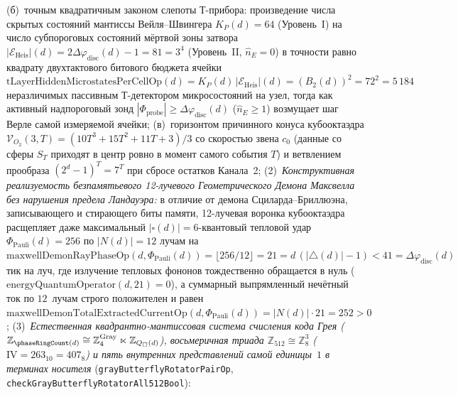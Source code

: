 \begin{theorem}
\begin{enumerate}[label=\textbf{(\roman*)},leftmargin=*]
\begin{itemize}[noitemsep,leftmargin=*]
\begin{enumerate}[label=(\alph*),noitemsep]
      (б)~точным квадратичным законом слепоты Т-прибора: произведение числа скрытых состояний мантиссы Вейля--Швингера $K_P(d)=64$ (Уровень~I) на число субпороговых состояний мёртвой зоны затвора $|\mathcal{E}_{\mathrm{Heis}}|(d) = 2\Delta\varphi_{\mathrm{disc}}(d)-1 = 81 = 3^4$ (Уровень~II, $\hat n_E = 0$) в точности равно квадрату двухтактового битового бюджета ячейки $\mathrm{tLayerHiddenMicrostatesPerCellOp}(d) = K_P(d)\,|\mathcal{E}_{\mathrm{Heis}}|(d) = (B_2(d))^2 = 72^2 = 5\,184$ неразличимых пассивным Т-детектором микросостояний на узел, тогда как активный надпороговый зонд $|\Phi_{\mathrm{probe}}|\ge\Delta\varphi_{\mathrm{disc}}(d)$ ($\hat n_E\ge 1$) возмущает шаг Верле самой измеряемой ячейки;
      (в)~горизонтом причинного конуса кубооктаэдра $\mathcal{V}_{O_2}(3,T) = (10T^3+15T^2+11T+3)/3$ со скоростью звена $c_0$ (данные со сферы $S_T$ приходят в центр ровно в момент самого события $T$) и ветвлением прообраза $(2^d-1)^T = 7^T$ при сбросе остатков Канала~2;
      (2)~\emph{Конструктивная реализуемость безпамятьевого 12-лучевого Геометрического Демона Максвелла без нарушения предела Ландауэра:} в отличие от демона Сциларда--Бриллюэна, записывающего и стирающего биты памяти, 12-лучевая воронка кубооктаэдра расщепляет даже максимальный $|\square(d)|=6$-квантовый тепловой удар $\Phi_{\mathrm{Pauli}}(d)=256$ по $|N(d)|=12$ лучам на $\mathrm{maxwellDemonRayPhaseOp}(d,\Phi_{\mathrm{Pauli}}(d)) = \lfloor 256/12\rfloor = 21 = d\,(|{\triangle}(d)|-1) < 41 = \Delta\varphi_{\mathrm{disc}}(d)$ тик на луч, где излучение тепловых фононов тождественно обращается в нуль ($\mathrm{energyQuantumOperator}(d,21) = 0$), а суммарный выпрямленный нечётный ток по $12$~лучам строго положителен и равен $\mathrm{maxwellDemonTotalExtractedCurrentOp}(d,\Phi_{\mathrm{Pauli}}(d)) = |N(d)|\cdot 21 = 252 > 0$;
      (3)~\emph{Естественная квадрантно-мантиссовая система счисления кода Грея ($\mathbb{Z}_{\phaseRingCount(d)}\cong\mathbb{Z}_4^{\mathrm{Gray}}\ltimes\mathbb{Z}_{Q_\square(d)}$), восьмеричная триада $\mathbb{Z}_{512}\cong\mathbb{Z}_8^3$ ($\mathrm{IV}=263_{10}=407_8$) и пять внутренних представлений самой единицы~$1$ в терминах носителя} (\texttt{grayButterflyRotatorPairOp}, \texttt{checkGrayButterflyRotatorAll512Bool}):

\end{enumerate}
\end{itemize}
\end{enumerate}
\end{theorem}

